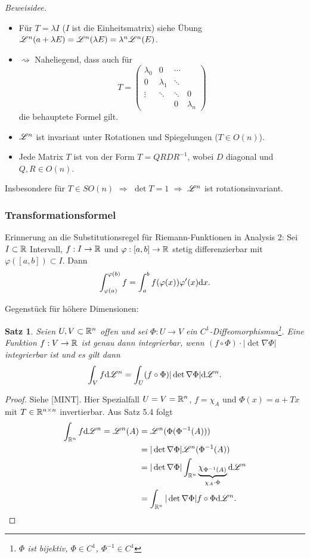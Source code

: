 \documentclass[
 a4paper,
 12pt,
 parskip=half
 ]{scrartcl}
\theoremstyle{plain}
\newtheorem*{thm*}{Satz}
\theoremstyle{definition}
\numberwithin{equation}{section}
\begin{document}
\emph{Beweisidee.} 
\begin{itemize}
 \item Für $T = \lambda I$ ($I$ ist die Einheitsmatrix) siehe Übung $\mathscr{L}^n (a + \lambda E) = \mathscr{L}^n ( \lambda E ) = \lambda^n \mathscr{L}^n (E)$. 
 \item $\rightsquigarrow$ Naheliegend, dass auch für 
\[ T = \begin{pmatrix} 
        \lambda_0 & 0 & \cdots & \\
        0 & \lambda_1 & \ddots & \\
        \vdots  & \ddots & \ddots & 0 \\
          &  & 0 & \lambda_n
       \end{pmatrix} \]
 die behauptete Formel gilt.
 \item $\mathscr{L}^n$ ist invariant unter Rotationen und Spiegelungen ($T \in O(n)$).
 \item Jede Matrix $T$ ist von der Form $T = QRDR^{-1}$, wobei $D$ diagonal und $Q,R \in O(n)$.
\end{itemize}

Insbesondere für $T \in SO(n)$ $\Rightarrow$ $\det T = 1$ $\Rightarrow$ $\mathscr{L}^n$ ist rotationsinvariant.

\subsubsection{Transformationsformel}
Erinnerung an die Substitutionsregel für Riemann-Funktionen in Analysis 2: Sei $I \subset \mathbb{R}$ Intervall, $f:I \to \mathbb{R}$ und $\varphi:[a,b] \to \mathbb{R}$ stetig differenzierbar mit $\varphi([a,b]) \subset I$. Dann
\[ \int_{\varphi(a)}^{\varphi(b)} f = \int_a^b f(\varphi(x)) \varphi'(x) \mathrm{d} x. \]

Gegenstück für höhere Dimensionen:
\begin{thm*}
 Seien $U,V \subset \mathbb{R}^n$ offen und sei $\Phi: U \to V$ ein $C^1$-Diffeomorphismus\footnote{$\Phi$ ist bijektiv, $\Phi \in C^1$, $\Phi^{-1} \in C^1$}. Eine Funktion $f: V \to \mathbb{R}$ ist genau dann integrierbar, wenn $(f \circ \Phi) \cdot | \det \nabla \Phi |$ integrierbar ist und es gilt dann
 \[ \int_V f \mathrm{d} \mathscr{L}^n = \int_U (f \circ \Phi) | \det \nabla \Phi | \mathrm{d} \mathscr{L}^n. \]
\end{thm*}

\begin{proof}
 Siehe [MINT]. Hier Spezialfall $U=V=\mathbb{R}^n$, $f = \chi_A$ und $\Phi(x) = a + Tx$ mit $T \in \mathbb{R}^{n \times n}$ invertierbar. Aus Satz 5.4 folgt
 \begin{align*}
    \int_{\mathbb{R}^n} f \mathrm{d} \mathscr{L}^n = \mathscr{L}^n(A)
    &= \mathscr{L}^n ( \Phi( \Phi^{-1}( A ) )) \\
    &= | \det \nabla \Phi | \mathscr{L}^n( \Phi^{-1}(A) ) \\
    &= | \det \nabla \Phi | \int_{\mathbb{R}^n} \underbrace{\chi_{\Phi^{-1}(A)}}_{\chi_A \cdot \Phi} \mathrm{d} \mathscr{L}^n \\
    &= \int_{\mathbb{R}^n} | \det\nabla \Phi | f \circ \Phi \mathrm{d} \mathscr{L}^n. \qedhere
 \end{align*}
\end{proof}
\end{document}
